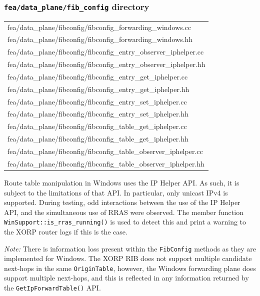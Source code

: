 \documentclass[11pt]{article}
\begin{document}
{\subsubsection{{\tt fea/data\_plane/fib\_config} directory}

\begin{center}
\begin{tabular}{|l|}
 \hline
	fea/data\_plane/fibconfig/fibconfig\_forwarding\_windows.cc \\
	fea/data\_plane/fibconfig/fibconfig\_forwarding\_windows.hh \\
	fea/data\_plane/fibconfig/fibconfig\_entry\_observer\_iphelper.cc \\
	fea/data\_plane/fibconfig/fibconfig\_entry\_observer\_iphelper.hh \\
	fea/data\_plane/fibconfig/fibconfig\_entry\_get\_iphelper.cc \\
	fea/data\_plane/fibconfig/fibconfig\_entry\_get\_iphelper.hh \\
	fea/data\_plane/fibconfig/fibconfig\_entry\_set\_iphelper.cc \\
	fea/data\_plane/fibconfig/fibconfig\_entry\_set\_iphelper.hh \\
	fea/data\_plane/fibconfig/fibconfig\_table\_get\_iphelper.cc \\
	fea/data\_plane/fibconfig/fibconfig\_table\_get\_iphelper.hh \\
	fea/data\_plane/fibconfig/fibconfig\_table\_observer\_iphelper.cc \\
	fea/data\_plane/fibconfig/fibconfig\_table\_observer\_iphelper.hh \\
 \hline
\end{tabular}
\end{center}

Route table manipulation in Windows uses the IP Helper API. As such,
it is subject to the limitations of that API. In particular,
only unicast IPv4 is supported.
During testing, odd interactions between the use of the IP Helper API, and
the simultaneous use of RRAS were observed. The member function
{\tt WinSupport::is\_rras\_running()}
is used to detect this and print a warning to the XORP router logs
if this is the case.

{\em Note:} There is information loss present within the {\tt FibConfig}
methods as they are implemented for Windows. The XORP RIB does not
support multiple candidate next-hops in the same {\tt OriginTable},
however, the Windows forwarding plane does support multiple next-hops,
and this is reflected in any information returned by the
{\tt GetIpForwardTable()}
API.

}
\end{document}
